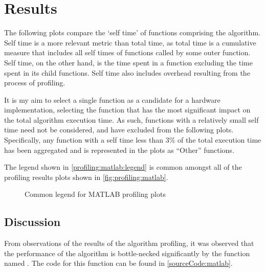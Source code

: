 \section{Results}
\label{profiling:matlab:results}
The following plots compare the `self time' of functions comprising the
 algorithm. Self time is a more
relevant metric than total time, as total time is a cumulative measure that
includes all self times of functions called by some outer function. Self time,
on the other hand, is the time spent in a function excluding the time spent in
its child functions. Self time also includes overhead resulting from the process
of profiling.

It is my aim to select a single function as a candidate for a hardware
implementation, selecting the function that has the most significant impact on
the total algorithm execution time. As such, functions with a relatively small
self time need not be considered, and have excluded from the following plots.
Specifically, any function with a self time less than 3\% of the total execution
time has been aggregated and is represented in the plots as ``Other'' functions.

The legend shown in \autoref{profiling:matlab:legend} is common amongst all of
the  profiling results plots shown in
\autoref{fig:profiling:matlab}.

\begin{figure}
    \centering
    
    \caption{Common legend for MATLAB profiling plots}
    \label{profiling:matlab:legend}
\end{figure}


\subsection{Discussion}
\label{algorithmPerformance:discussion}
From observations of the results of the algorithm profiling, it was observed
that the performance of the 
algorithm is bottle-necked significantly by the function named
. The  code for this
function can be found in \autoref{sourceCode:matlab}.


